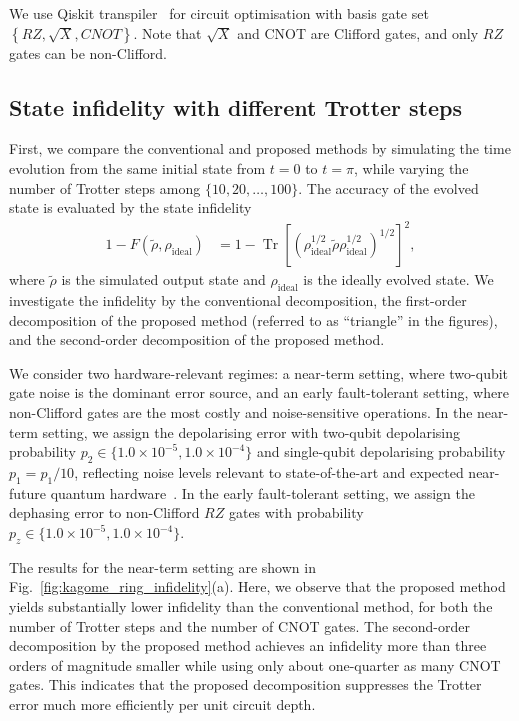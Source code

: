 \documentclass[aps,showpacs,amsmath,amssymb,twocolumn,prx,longbibliography,superscriptaddress,notitlepage,floatfix,10pt]{revtex4-2}
\begin{document}
We use Qiskit transpiler~\cite{qiskit2024} for circuit optimisation with basis gate set $\left\{RZ, \sqrt{X}, CNOT\right\}$.
Note that $\sqrt{X}$ and CNOT are Clifford gates, and only $RZ$ gates can be non-Clifford.


\subsection{State infidelity with different Trotter steps}

First, we compare the conventional and proposed methods by simulating the time evolution from the same initial state from $t=0$ to $t=\pi$, while varying the number of Trotter steps among $\{10,20,\ldots, 100\}$.
The accuracy of the evolved state is evaluated by the state infidelity
\begin{equation}
\begin{split}
    1 - F(\tilde{\rho}, \rho_{\mathrm{ideal}})
    &= 1 - \operatorname{Tr} \left[\left(\rho_{\mathrm{ideal}}^{1/2} \tilde{\rho} \rho_{\mathrm{ideal}}^{1/2}\right)^{1/2}\right]^{2},
\end{split}
\end{equation}
where $\tilde{\rho}$ is the simulated output state and $\rho_{\mathrm{ideal}}$ is the ideally evolved state.
We investigate the infidelity by the conventional decomposition, the first-order decomposition of the proposed method (referred to as ``triangle'' in the figures), and the second-order decomposition of the proposed method.

We consider two hardware-relevant regimes: a near-term setting, where two-qubit gate noise is the dominant error source, and an early fault-tolerant setting, where non-Clifford gates are the most costly and noise-sensitive operations.
In the near-term setting, we assign the depolarising error with two-qubit depolarising probability $p_{2} \in \{1.0\times 10^{-5}, 1.0\times 10^{-4}\}$ and single-qubit depolarising probability $p_{1}=p_{1}/10$, reflecting noise levels relevant to state-of-the-art and expected near-future quantum hardware~\cite{Hughes2025Trapped-ion, Ransford2025Helios}.
In the early fault-tolerant setting, we assign the dephasing error to non-Clifford $RZ$ gates with probability $p_{z} \in \{1.0\times 10^{-5}, 1.0\times 10^{-4}\}$.

The results for the near-term setting are shown in Fig.~\ref{fig:kagome_ring_infidelity}(a).
Here, we observe that the proposed method yields substantially lower infidelity than the conventional method, for both the number of Trotter steps and the number of CNOT gates.
The second-order decomposition by the proposed method achieves an infidelity more than three orders of magnitude smaller while using only about one-quarter as many CNOT gates.
This indicates that the proposed decomposition suppresses the Trotter error much more efficiently per unit circuit depth.
\end{document}
